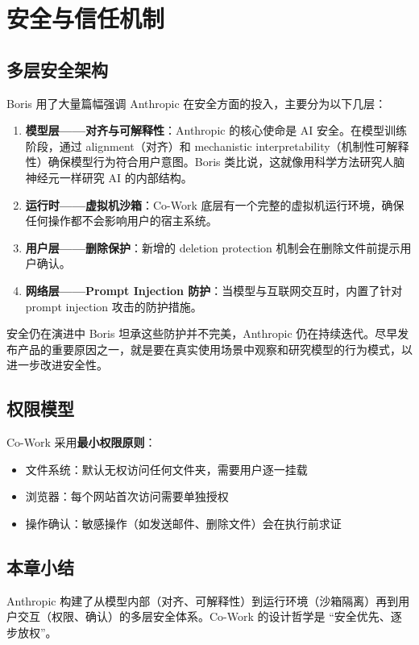 \section{安全与信任机制}

\subsection{多层安全架构}

Boris 用了大量篇幅强调 Anthropic 在安全方面的投入，主要分为以下几层：

\begin{enumerate}
    \item \textbf{模型层——对齐与可解释性}：Anthropic 的核心使命是 AI 安全。在模型训练阶段，通过 alignment（对齐）和 mechanistic interpretability（机制性可解释性）确保模型行为符合用户意图。Boris 类比说，这就像用科学方法研究人脑神经元一样研究 AI 的内部结构。

    \item \textbf{运行时——虚拟机沙箱}：Co-Work 底层有一个完整的虚拟机运行环境，确保任何操作都不会影响用户的宿主系统。

    \item \textbf{用户层——删除保护}：新增的 deletion protection 机制会在删除文件前提示用户确认。

    \item \textbf{网络层——Prompt Injection 防护}：当模型与互联网交互时，内置了针对 prompt injection 攻击的防护措施。
\end{enumerate}

\begin{warningbox}{安全仍在演进中}
Boris 坦承这些防护并不完美，Anthropic 仍在持续迭代。尽早发布产品的重要原因之一，就是要在真实使用场景中观察和研究模型的行为模式，以进一步改进安全性。
\end{warningbox}

\subsection{权限模型}

Co-Work 采用\textbf{最小权限原则}：

\begin{itemize}
    \item 文件系统：默认无权访问任何文件夹，需要用户逐一挂载
    \item 浏览器：每个网站首次访问需要单独授权
    \item 操作确认：敏感操作（如发送邮件、删除文件）会在执行前求证
\end{itemize}

\subsection{本章小结}

Anthropic 构建了从模型内部（对齐、可解释性）到运行环境（沙箱隔离）再到用户交互（权限、确认）的多层安全体系。Co-Work 的设计哲学是 ``安全优先、逐步放权''。

